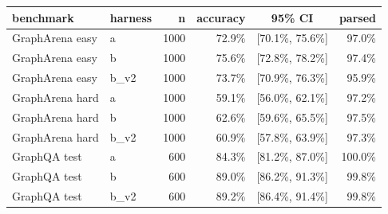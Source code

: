 \begin{tabular}{llrrcr}
\toprule
benchmark & harness & n & accuracy & 95\% CI & parsed \\
\midrule
GraphArena easy & a & 1000 & 72.9\% & [70.1\%, 75.6\%] & 97.0\% \\
GraphArena easy & b & 1000 & 75.6\% & [72.8\%, 78.2\%] & 97.4\% \\
GraphArena easy & b\_v2 & 1000 & 73.7\% & [70.9\%, 76.3\%] & 95.9\% \\
GraphArena hard & a & 1000 & 59.1\% & [56.0\%, 62.1\%] & 97.2\% \\
GraphArena hard & b & 1000 & 62.6\% & [59.6\%, 65.5\%] & 97.5\% \\
GraphArena hard & b\_v2 & 1000 & 60.9\% & [57.8\%, 63.9\%] & 97.3\% \\
GraphQA test & a & 600 & 84.3\% & [81.2\%, 87.0\%] & 100.0\% \\
GraphQA test & b & 600 & 89.0\% & [86.2\%, 91.3\%] & 99.8\% \\
GraphQA test & b\_v2 & 600 & 89.2\% & [86.4\%, 91.4\%] & 99.8\% \\
\bottomrule
\end{tabular}
